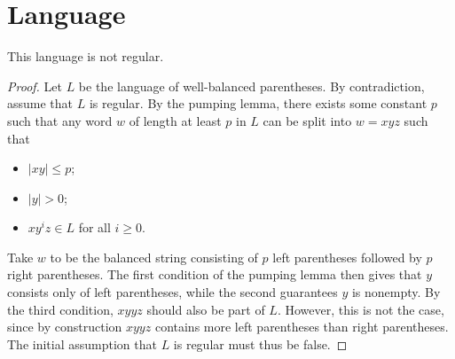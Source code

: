 \documentclass[11pt]{article}
\begin{document}
\section{Language}
This language is not regular.
\begin{proof}
	Let \(L\) be the language of well-balanced parentheses.
	By contradiction, assume that \(L\) is regular.
	By the pumping lemma, there exists some constant \(p\) such that any word \(w\) of length at least \(p\) in \(L\) can be split into \(w = xyz\) such that
	\begin{itemize}
		\item \(|xy| \le p\);
		\item \(|y| > 0\);
		\item \(x y^i z \in L\) for all \(i \ge 0\).
	\end{itemize}
	
	Take \(w\) to be the balanced string consisting of \(p\) left parentheses followed by \(p\) right parentheses.
	The first condition of the pumping lemma then gives that \(y\) consists only of left parentheses, while the second guarantees \(y\) is nonempty.
	By the third condition, \(xyyz\) should also be part of \(L\).
	However, this is not the case, since by construction \(xyyz\) contains more left parentheses than right parentheses. The initial assumption that \(L\) is regular must thus be false.
\end{proof}
\end{document}
